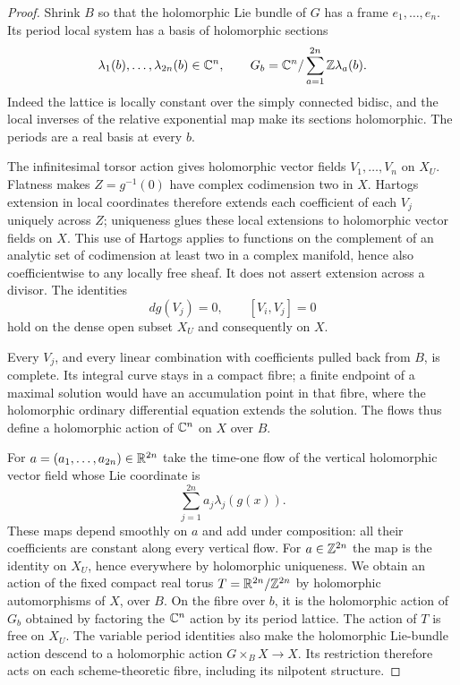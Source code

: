 \begin{proof}
Shrink $B$ so that the holomorphic Lie bundle of $G$ has a
frame $e_1,\ldots,e_n$.  Its period local system has a basis
of holomorphic sections
\[
 \lambda_1(b),\ldots,\lambda_{2n}(b)\in\mathbb C^n,
 \qquad
 G_b=\mathbb C^n/\sum_{a=1}^{2n}\mathbb Z\lambda_a(b).
\]
Indeed the lattice is locally constant over the simply
connected bidisc, and the local inverses of the relative
exponential map make its sections holomorphic.  The periods
are a real basis at every $b$.

The infinitesimal torsor action gives holomorphic vector
fields $V_1,\ldots,V_n$ on $X_U$.  Flatness makes
$Z=g^{-1}(0)$ have complex codimension two in $X$.
Hartogs extension in local coordinates therefore extends
each coefficient of each $V_j$ uniquely across $Z$; uniqueness
glues these local extensions to holomorphic vector fields
on $X$.  This use of Hartogs applies to functions on the
complement of an analytic set of codimension at least two
in a complex manifold, hence also coefficientwise to any
locally free sheaf.  It does not assert extension across a
divisor.  The identities
\[
 dg(V_j)=0,\qquad [V_i,V_j]=0
\]
hold on the dense open subset $X_U$ and consequently on $X$.

Every $V_j$, and every linear combination with coefficients
pulled back from $B$, is complete.  Its integral curve stays
in a compact fibre; a finite endpoint of a maximal solution
would have an accumulation point in that fibre, where the
holomorphic ordinary differential equation extends the
solution.  The flows thus define a holomorphic action of
$\mathbb C^n$ on $X$ over $B$.

For $a=(a_1,\ldots,a_{2n})\in\mathbb R^{2n}$ take the time-one
flow of the vertical holomorphic vector field whose Lie
coordinate is
\[
 \sum_{j=1}^{2n}a_j\lambda_j(g(x)).
\]
These maps depend smoothly on $a$ and add under composition:
all their coefficients are constant along every vertical
flow.  For $a\in\mathbb Z^{2n}$ the map is the identity on $X_U$,
hence everywhere by holomorphic uniqueness.  We obtain an
action of the fixed compact real torus
$T=\mathbb R^{2n}/\mathbb Z^{2n}$ by holomorphic automorphisms of $X$,
over $B$.  On the fibre over $b$, it is the holomorphic
action of $G_b$ obtained by factoring the $\mathbb C^n$ action by
its period lattice.  The action of $T$ is free on $X_U$.
The variable period identities also make the holomorphic
Lie-bundle action descend to a holomorphic action
$G\times_BX\to X$.  Its restriction therefore acts on
each scheme-theoretic fibre, including its nilpotent
structure.


\end{proof}
